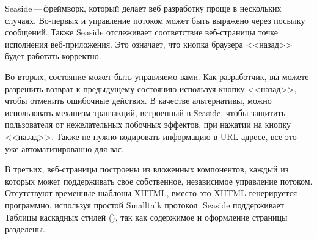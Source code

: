 \documentclass[a4paper,10pt,twoside]{book}
\begin{document}

Seaside\,---\,фреймворк, который делает веб разработку проще в нескольких 
случаях.
Во-первых и управление потоком может быть выражено через посылку
сообщений. Также Seaside отслеживает соответствие веб-страницы точке
исполнения веб-приложения. Это означает, что кнопка браузера <<назад>>
будет работать корректно.



Во-вторых, состояние может быть управляемо вами.
Как разработчик, вы можете разрешить возврат к предыдущему состоянию
используя кнопку <<назад>>, чтобы отменить ошибочные действия.
В качестве альтернативы, можно использовать механизм транзакций,
встроенный в Seaside,
чтобы защитить пользователя от нежелательных побочных эффектов,
при нажатии на кнопку <<назад>>.
Также не нужно кодировать информацию в URL адресе, все это уже автоматизированно для вас.


В третьих, веб-страницы построены из вложенных компонентов,
каждый из которых может поддерживать свое собственное,
независимое управление потоком.
Отсутствуют временные шаблоны XHTML,
вместо это XHTML генерируется программно,
используя простой Smalltalk протокол.
Seaside поддерживает Таблицы каскадных стилей (),
так как содержимое и оформление страницы разделены.

\end{document}
